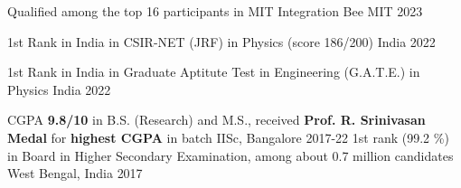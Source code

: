 




\begin{cvhonors}

 \cvhonor
{} %
{Qualified among the top 16 participants in MIT Integration Bee} %
{MIT} %
{2023} %

 \cvhonor
{1st Rank in India} %
{in CSIR-NET (JRF) in Physics (score 186/200)} %
{India} %
{2022} %

 \cvhonor
{1st Rank in India} %
{in Graduate Aptitute Test in Engineering (G.A.T.E.) in Physics} %
{India} %
{2022} %

  \cvhonor
{} %
{CGPA \textbf{9.8/10} in B.S. (Research) and M.S., received \textbf{Prof. R. Srinivasan Medal} for \textbf{highest CGPA} in batch} %
{IISc, Bangalore} %
{2017-22} %
  \cvhonor
    {1st rank (99.2 \%) in Board} %
    {in Higher Secondary Examination, among about 0.7 million candidates} %
    {West Bengal, India} %
    {2017} %


	 


\end{cvhonors}
